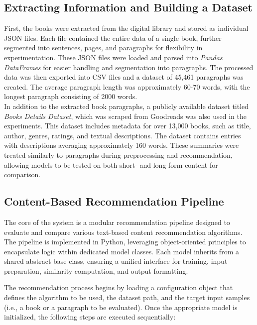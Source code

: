 \documentclass[\myFontSize,a4paper,oneside,english,hidelinks]{article}
\begin{document}
\subsection{Extracting Information and Building a Dataset}
First, the books were extracted from the digital library and stored as individual JSON files. Each file contained the entire data of a single book, further segmented into sentences, pages, and paragraphs for flexibility in experimentation. These JSON files were loaded and parsed into \textit{Pandas DataFrames} for easier handling and segmentation into paragraphs. The processed data was then exported into CSV files and a dataset of 45,461 paragraphs was created. 
The average paragraph length was approximately 60-70 words, with the longest paragraph consisting of 2000 words.\\
In addition to the extracted book paragraphs, a publicly available dataset titled \textit{Books Details Dataset}, which was scraped from Goodreads \cite{goodreads_kumar_2022} was also used in the experiments. This dataset includes metadata for over 13,000 books, such as title, author, genres, ratings, and textual descriptions. The dataset contains entries with descriptions averaging approximately 160 words. These summaries were treated similarly to paragraphs during preprocessing and recommendation, allowing models to be tested on both short- and long-form content for comparison.


\subsection{Content-Based Recommendation Pipeline}
The core of the system is a modular recommendation pipeline designed to evaluate and compare various text-based content recommendation algorithms. The pipeline is implemented in Python, leveraging object-oriented principles to encapsulate logic within dedicated model classes. Each model inherits from a shared abstract base class, ensuring a unified interface for training, input preparation, similarity computation, and output formatting.

The recommendation process begins by loading a configuration object that defines the algorithm to be used, the dataset path, and the target input samples (i.e., a book or a paragraph to be evaluated). Once the appropriate model is initialized, the following steps are executed sequentially:
\end{document}
